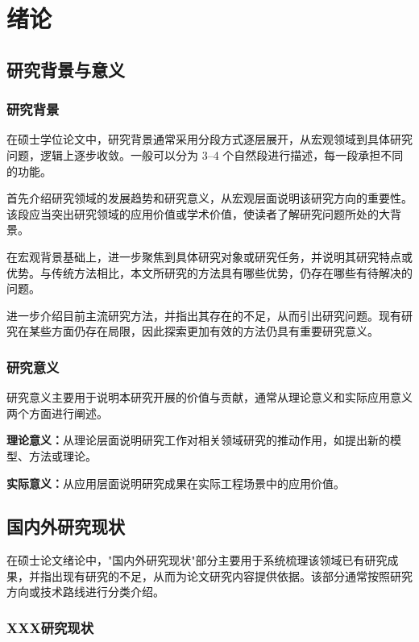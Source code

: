 
\chapter{绪论}

\section{研究背景与意义}

\subsection{研究背景}

在硕士学位论文中，研究背景通常采用分段方式逐层展开，从宏观领域到具体研究问题，逻辑上逐步收敛。一般可以分为 3–4 个自然段进行描述，每一段承担不同的功能。

首先介绍研究领域的发展趋势和研究意义，从宏观层面说明该研究方向的重要性。该段应当突出研究领域的应用价值或学术价值，使读者了解研究问题所处的大背景。

在宏观背景基础上，进一步聚焦到具体研究对象或研究任务，并说明其研究特点或优势。与传统方法相比，本文所研究的方法具有哪些优势，仍存在哪些有待解决的问题。

进一步介绍目前主流研究方法，并指出其存在的不足，从而引出研究问题。现有研究在某些方面仍存在局限，因此探索更加有效的方法仍具有重要研究意义。

\subsection{研究意义}

研究意义主要用于说明本研究开展的价值与贡献，通常从理论意义和实际应用意义两个方面进行阐述。

\textbf{理论意义：}从理论层面说明研究工作对相关领域研究的推动作用，如提出新的模型、方法或理论。

\textbf{实际意义：}从应用层面说明研究成果在实际工程场景中的应用价值。

\section{国内外研究现状}

在硕士论文绪论中，"国内外研究现状"部分主要用于系统梳理该领域已有研究成果，并指出现有研究的不足，从而为论文研究内容提供依据。该部分通常按照研究方向或技术路线进行分类介绍。

\subsection{XXX研究现状}

